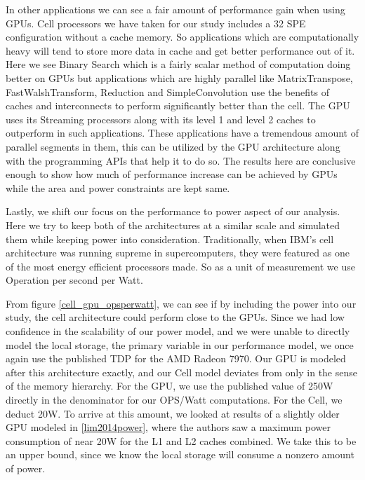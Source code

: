 \documentclass{sig-alternate-05-2015}
\begin{document}
In other applications we can see a fair amount of performance gain when using GPUs. Cell processors we have taken for our study includes a 32 SPE configuration without a cache memory. So applications which are computationally heavy will tend to store more data in cache and get better performance out of it. Here we see Binary Search which is a fairly scalar method of computation doing better on GPUs but applications which are highly parallel like MatrixTranspose, FastWalshTransform, Reduction and SimpleConvolution use the benefits of caches and interconnects to perform significantly better than the cell. The GPU uses its Streaming processors along with its level 1 and level 2 caches to outperform in such applications. These applications have a tremendous amount of parallel segments in them, this can be utilized by the GPU architecture along with the programming APIs that help it to do so. 
The results here are conclusive enough to show how much of performance increase can be achieved by GPUs while the area and power constraints are kept same. 

Lastly, we shift our focus on the performance to power aspect of our analysis. Here we try to keep both of the architectures  at a similar scale and simulated them while keeping power into consideration. Traditionally, when IBM’s cell architecture was running supreme in supercomputers, they were featured as one of the most energy efficient processors made. So as a unit of measurement we use Operation per second per Watt. 

From figure \ref{cell_gpu_opsperwatt}, we can see if by including the power into our study, the cell architecture could perform close to the GPUs. Since we had low confidence in the scalability of our power model, and we were unable to directly model the local storage, the primary variable in our performance model, we once again use the published TDP for the AMD Radeon 7970. Our GPU is modeled after this architecture exactly, and our Cell model deviates from only in the sense of the memory hierarchy. For the GPU, we use the published value of 250W directly in the denominator for our OPS/Watt computations. For the Cell, we deduct 20W. To arrive at this amount, we looked at results of a slightly older GPU modeled in \ref{lim2014power}, where the authors saw a maximum power consumption of near 20W for the L1 and L2 caches combined. We take this to be an upper bound, since we know the local storage will consume a nonzero amount of power.
\end{document}
